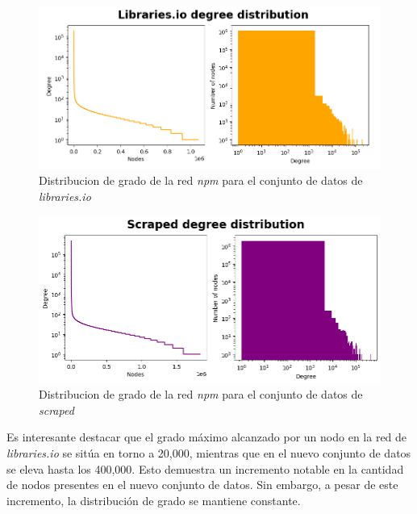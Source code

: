 \begin{figure}[ht!]
    \begin{center}
        \includegraphics[width=1\textwidth]{img/npm/ddist_l.png}
        \caption{Distribucion de grado de la red \textit{npm} para el conjunto de datos de \textit{libraries.io}}
    \end{center}
    \label{fig:npm_dd_libraries}
\end{figure}

\begin{figure}[ht!]
    \begin{center}
        \includegraphics[width=1\textwidth]{img/npm/dd_s.png}
        \caption{Distribucion de grado de la red \textit{npm} para el conjunto de datos de \textit{scraped}}
    \end{center}
    \label{fig:npm_dd_scraped}
\end{figure}

Es interesante destacar que el grado máximo alcanzado por un nodo en la red de \emph{libraries.io} se
sitúa en torno a 20,000, mientras que en el nuevo conjunto de datos se eleva hasta los 400,000.
Esto demuestra un incremento notable en la cantidad de nodos presentes en el nuevo conjunto de datos.
Sin embargo, a pesar de este incremento, la distribución de grado se mantiene constante.

